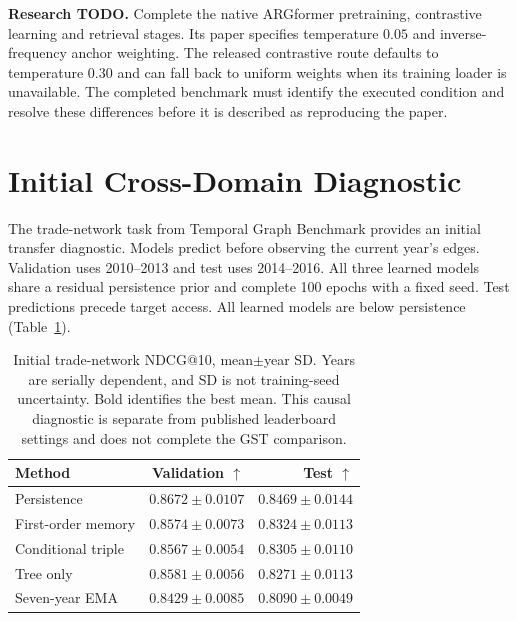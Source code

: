 \documentclass[letterpaper]{article}
\newcommand{\best}[1]{\mathbf{#1}}
\newcommand{\todo}[1]{\par\noindent\textbf{Research TODO.} #1\par}
\begin{document}
\todo{Complete the native ARGformer pretraining, contrastive learning and retrieval stages. Its paper specifies temperature $0.05$ and inverse-frequency anchor weighting. The released contrastive route defaults to temperature $0.30$ and can fall back to uniform weights when its training loader is unavailable. The completed benchmark must identify the executed condition and resolve these differences before it is described as reproducing the paper.}

\section{Initial Cross-Domain Diagnostic}
The trade-network task from Temporal Graph Benchmark \citep{tgb2023} provides an initial transfer diagnostic. Models predict before observing the current year's edges. Validation uses 2010--2013 and test uses 2014--2016. All three learned models share a residual persistence prior and complete 100 epochs with a fixed seed. Test predictions precede target access. All learned models are below persistence (Table~\ref{tab:trade}).

\begin{table}[htbp]
\centering
\small
\begin{tabular}{@{}lrr@{}}
\toprule
Method & Validation $\uparrow$ & Test $\uparrow$\\
\midrule
Persistence &$\best{0.8672\pm0.0107}$&$\best{0.8469\pm0.0144}$\\
First-order memory &$0.8574\pm0.0073$&$0.8324\pm0.0113$\\
Conditional triple &$0.8567\pm0.0054$&$0.8305\pm0.0110$\\
Tree only &$0.8581\pm0.0056$&$0.8271\pm0.0113$\\
Seven-year EMA &$0.8429\pm0.0085$&$0.8090\pm0.0049$\\
\bottomrule
\end{tabular}
\caption{Initial trade-network NDCG@10, mean$\pm$year SD. Years are serially dependent, and SD is not training-seed uncertainty. Bold identifies the best mean. This causal diagnostic is separate from published leaderboard settings and does not complete the GST comparison.}
\label{tab:trade}
\end{table}
\end{document}
